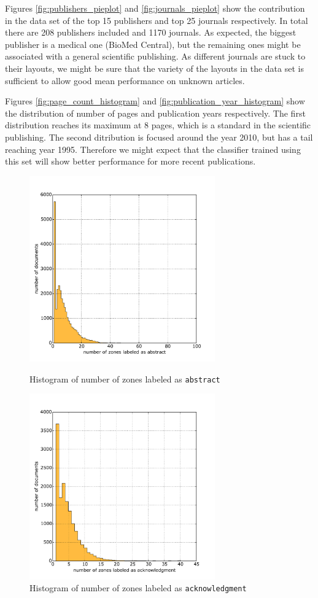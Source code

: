 Figures \ref{fig:publishers_pieplot} and \ref{fig:journals_pieplot} show the contribution in the data set of the top 15 publishers and top 25 journals respectively. In total there are 208 publishers included and 1170 journals. As expected, the biggest publisher is a medical one (BioMed Central), but the remaining ones might be associated with a general scientific publishing. As different journals are stuck to their layouts, we might be sure that the variety of the layouts in the data set is sufficient to allow good mean performance on unknown articles.

Figures \ref{fig:page_count_histogram} and \ref{fig:publication_year_histogram} show the distribution of number of pages and publication years respectively. The first distribution reaches its maximum at 8 pages, which is a standard in the scientific publishing. The second ditribution is focused around the year 2010, but has a tail reaching year 1995. Therefore we might expect that the classifier trained using this set will show better performance for more recent publications.
\begin{figure}[b!]
\centering
\begin{minipage}[t!]{0.48\linewidth}
  \includegraphics[width=8cm]{plots/abstract_histogram}
  \caption{Histogram of number of zones labeled as \texttt{abstract}}
  \label{fig:abstract_histogram}
\end{minipage}
\quad
\begin{minipage}[t!]{0.48\linewidth}
  \includegraphics[width=8cm]{plots/acknowledgment_histogram}
  \caption{Histogram of number of zones labeled as \texttt{acknowledgment}}
  \label{fig:acknowledgment_histogram}
\end{minipage}
\end{figure}

